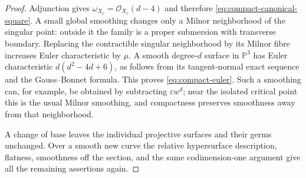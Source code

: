\begin{proof}
Adjunction gives $\omega_{X_c}=\mathcal O_{X_c}(d-4)$ and therefore
\eqref{eq:compact-canonical-square}.  A small global smoothing changes
only a Milnor neighborhood of the singular point: outside it the
family is a proper submersion with transverse boundary.  Replacing
the contractible singular neighborhood by its Milnor fibre increases
Euler characteristic by $\mu$.  A smooth degree-$d$ surface in
$\mathbb P^3$ has Euler characteristic $d(d^2-4d+6)$, as follows from
its tangent-normal exact sequence and the Gauss--Bonnet formula.
This proves \eqref{eq:compact-euler}.  Such a smoothing can, for example,
be obtained by subtracting $\varepsilon w^d$; near the isolated
critical point this is the usual Milnor smoothing, and compactness
preserves smoothness away from that neighborhood.

A change of base leaves the individual projective surfaces and their
germs unchanged.  Over a smooth new curve the relative hypersurface
description, flatness, smoothness off the section, and the same
codimension-one argument give all the remaining assertions again.
\end{proof}
